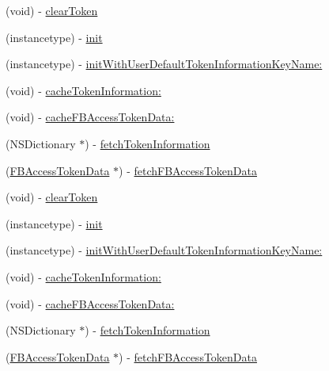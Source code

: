 \begin{DoxyCompactItemize}
\item 
(void) -\/ \hyperlink{interfaceFBSessionTokenCachingStrategy_a4cc3c2711517839cecad4b3047a28f85}{clear\+Token}
\item 
(instancetype) -\/ \hyperlink{interfaceFBSessionTokenCachingStrategy_adf7a7150fecc4aab6dea9e7c0b64760b}{init}
\item 
(instancetype) -\/ \hyperlink{interfaceFBSessionTokenCachingStrategy_a450317ada46fcbed38bf0edf0d0cede9}{init\+With\+User\+Default\+Token\+Information\+Key\+Name\+:}
\item 
(void) -\/ \hyperlink{interfaceFBSessionTokenCachingStrategy_a89929f2fc1d8d29bb1add6e607d7c864}{cache\+Token\+Information\+:}
\item 
(void) -\/ \hyperlink{interfaceFBSessionTokenCachingStrategy_a35d668a867fcc88c491bb8d0c815c9f9}{cache\+F\+B\+Access\+Token\+Data\+:}
\item 
(N\+S\+Dictionary $\ast$) -\/ \hyperlink{interfaceFBSessionTokenCachingStrategy_a08b75ac08ae3b7a1ad769f3b026f857c}{fetch\+Token\+Information}
\item 
(\hyperlink{interfaceFBAccessTokenData}{F\+B\+Access\+Token\+Data} $\ast$) -\/ \hyperlink{interfaceFBSessionTokenCachingStrategy_a7378a3d9006864d343e086bbfbe66948}{fetch\+F\+B\+Access\+Token\+Data}
\item 
(void) -\/ \hyperlink{interfaceFBSessionTokenCachingStrategy_a4cc3c2711517839cecad4b3047a28f85}{clear\+Token}
\item 
(instancetype) -\/ \hyperlink{interfaceFBSessionTokenCachingStrategy_adf7a7150fecc4aab6dea9e7c0b64760b}{init}
\item 
(instancetype) -\/ \hyperlink{interfaceFBSessionTokenCachingStrategy_a450317ada46fcbed38bf0edf0d0cede9}{init\+With\+User\+Default\+Token\+Information\+Key\+Name\+:}
\item 
(void) -\/ \hyperlink{interfaceFBSessionTokenCachingStrategy_a89929f2fc1d8d29bb1add6e607d7c864}{cache\+Token\+Information\+:}
\item 
(void) -\/ \hyperlink{interfaceFBSessionTokenCachingStrategy_a35d668a867fcc88c491bb8d0c815c9f9}{cache\+F\+B\+Access\+Token\+Data\+:}
\item 
(N\+S\+Dictionary $\ast$) -\/ \hyperlink{interfaceFBSessionTokenCachingStrategy_a08b75ac08ae3b7a1ad769f3b026f857c}{fetch\+Token\+Information}
\item 
(\hyperlink{interfaceFBAccessTokenData}{F\+B\+Access\+Token\+Data} $\ast$) -\/ \hyperlink{interfaceFBSessionTokenCachingStrategy_a7378a3d9006864d343e086bbfbe66948}{fetch\+F\+B\+Access\+Token\+Data}

\end{DoxyCompactItemize}
